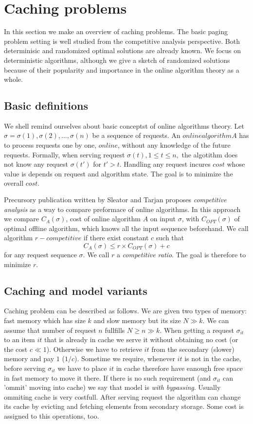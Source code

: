 \section{Caching problems}
In this section we make an overview of caching problems. The basic paging 
problem setting is well studied from the competitive analysis perspective. 
Both determinisic and randomized optimal solutions are already known. We focus 
on deterministic algorithms, although we give a sketch of randomized solutions 
because of their popularity and importance in the online algorithm theory as a 
whole. 
\subsection{Basic definitions}
We shell remind ourselves about basic conceptst of online algorithms theory. 
Let $\sigma = \sigma(1), \sigma(2), \ldots, \sigma(n)$ be a sequence of 
requests. An $online algorithm A$ has to process requests one by one, $online$, 
without any knowledge of the future requests. Formally, when serving request 
$\sigma(t), 1 \leq t \leq n,$ the algotithm does not know any request 
$\sigma(t')$ for $t'>t$. Handling any request incures $cost$ whose value is 
depends on request and algorithm state. The goal is to minimize the overall 
$cost$.

Precursory publication written by Sleator and Tarjan proposes 
\textit{competitive analysis} as a way to compare preformace of online 
algorithms. In this approach we compare $C_A(\sigma)$, cost of online algorithm 
$A$ on input $\sigma$, with $C_{OPT}(\sigma)$ of optimal offline algorithm, 
which knows all the input sequence beforehand. We call algorithm $r-competitive$ 
if there exist constant $c$ such that
$$C_A(\sigma) \leq r \times C_{OPT}(\sigma) + c$$
for any request sequence $\sigma$. We call $r$ a \textit{competitive ratio}. 
The goal is therefore to minimize $r$.

\subsection{Caching and model variants}
Caching problem can be described as follows. We are given two types of memory: 
fast memory which has size $k$ and slow memory but its size $N \gg k$. We can 
assume that number of request $n$ fullfills $N \geq n \gg k$. When getting a 
request $\sigma_{it}$to an item $it$ that is already in cache we serve it 
without obtaining no cost (or the cost $c \ll 1$). 
Otherwise we have to retrieve $it$ from the secondary (slower) memory and pay 
$1$ ($1/c$). Sometime we require, whenever $it$ is not in the cache, before 
serving $\sigma_{it}$ we have to place $it$ in cache therefore have eanough 
free space in fast memory to move it there. If there is no such requirement 
(and $\sigma_{it}$ can 'ommit' moving into cache) we say that model is 
\textit{with bypassing}. Usually ommiting cache is very costfull. After serving 
request the algorithm can change its cache by evicting and fetching elements 
from secondary storage. Some cost is assigned to this operations, too.

